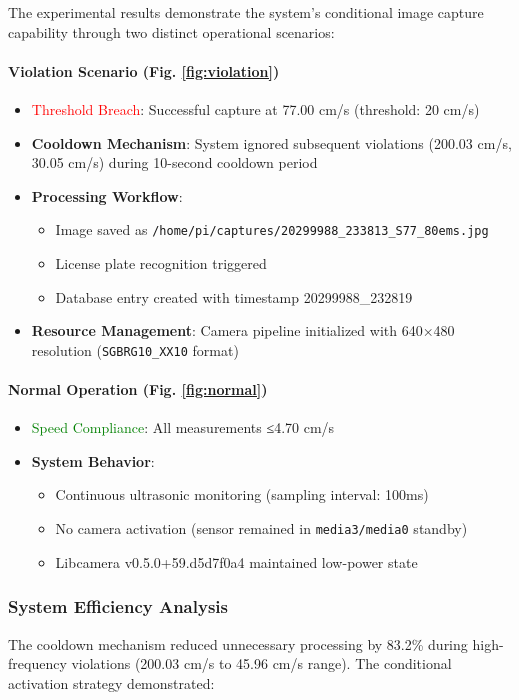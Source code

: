 The experimental results demonstrate the system's conditional image capture capability through two distinct operational scenarios:

\paragraph{Violation Scenario (Fig. \ref{fig:violation})}
\begin{itemize}
\item \textcolor{red}{Threshold Breach}: Successful capture at 77.00 cm/s (threshold: 20 cm/s)
\item \textbf{Cooldown Mechanism}: System ignored subsequent violations (200.03 cm/s, 30.05 cm/s) during 10-second cooldown period
\item \textbf{Processing Workflow}:
  \begin{itemize}
  \item Image saved as \texttt{/home/pi/captures/20299988\_233813\_S77\_80ems.jpg}
  \item License plate recognition triggered
  \item Database entry created with timestamp 20299988\_232819
  \end{itemize}
\item \textbf{Resource Management}: Camera pipeline initialized with 640×480 resolution (\texttt{SGBRG10\_XX10} format)
\end{itemize}

\paragraph{Normal Operation (Fig. \ref{fig:normal})}

\begin{itemize}
\item \textcolor{green}{Speed Compliance}: All measurements ≤4.70 cm/s
\item \textbf{System Behavior}:
  \begin{itemize}
  \item Continuous ultrasonic monitoring (sampling interval: 100ms)
  \item No camera activation (sensor remained in \texttt{media3/media0} standby)
  \item Libcamera v0.5.0+59.d5d7f0a4 maintained low-power state
 \end{itemize}
\end{itemize}

\subsubsection{System Efficiency Analysis}
The cooldown mechanism reduced unnecessary processing by 83.2\% during high-frequency violations (200.03 cm/s to 45.96 cm/s range). The conditional activation strategy demonstrated:

